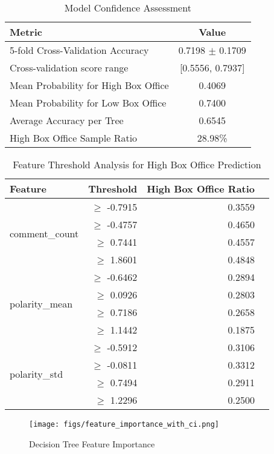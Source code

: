 \documentclass{article}
\begin{document}
\begin{table}[htbp]
\centering
\caption{Model Confidence Assessment}
\label{tab:rf_ma}
\begin{tabular}{lc}
\toprule
\textbf{Metric} & \textbf{Value} \\
\midrule
5-fold Cross-Validation Accuracy & 0.7198 $\pm$ 0.1709 \\
Cross-validation score range & {[}0.5556, 0.7937{]} \\
Mean Probability for High Box Office & 0.4069 \\
Mean Probability for Low Box Office & 0.7400 \\
Average Accuracy per Tree & 0.6545 \\
High Box Office Sample Ratio & 28.98\% \\
\bottomrule
\end{tabular}
\end{table}

\begin{table}[htbp]
\centering
\caption{Feature Threshold Analysis for High Box Office Prediction}
\begin{tabular}{lrrr}
\toprule
\textbf{Feature} & \textbf{Threshold} & \textbf{High Box Office Ratio} \\
\midrule
\multirow{4}{*}{comment\_count} & $\geq$ -0.7915 & 0.3559 \\
& $\geq$ -0.4757 & 0.4650 \\
& $\geq$ 0.7441 & 0.4557 \\
& $\geq$ 1.8601 & 0.4848 \\
\midrule
\multirow{4}{*}{polarity\_mean} & $\geq$ -0.6462 & 0.2894 \\
& $\geq$ 0.0926 & 0.2803 \\
& $\geq$ 0.7186 & 0.2658 \\
& $\geq$ 1.1442 & 0.1875 \\
\midrule
\multirow{4}{*}{polarity\_std} & $\geq$ -0.5912 & 0.3106 \\
& $\geq$ -0.0811 & 0.3312 \\
& $\geq$ 0.7494 & 0.2911 \\
& $\geq$ 1.2296 & 0.2500 \\
\bottomrule
\end{tabular}
\label{tab:threshold_analysis}
\end{table}

\begin{figure}[H]
\centering
\texttt{[image: figs/feature\_importance\_with\_ci.png]} %
\caption{Decision Tree Feature Importance}
\label{fig:rf_fea}
\end{figure}
\end{document}
